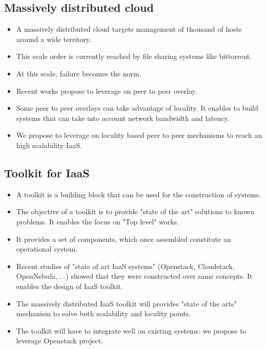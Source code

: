 \subsection{Massively distributed cloud}

\begin{itemize}

	\item A massively distributed cloud targets management of thousand of hosts around a wide territory.	
	
	\item This scale order is currently reached by file sharing systems like bittorrent.

	\item At this scale, failure becomes the norm.

	\item Recent works propose to leverage on peer to peer overlay.

	\item Some peer to peer overlays can take advantage of locality. It enables to build systems that can take
		  into account network bandwidth and latency.

	\item We propose to leverage on locality based peer to peer mechanisms to reach an high scalability IaaS.

\end{itemize}

\subsection{Toolkit for IaaS}

\begin{itemize}

	\item A toolkit is a building block that can be used for the construction of systems.

	\item The objective of a toolkit is to provide "state of the art" solutions to known problems. It enables the
		  focus on "Top level" works.

	\item It provides a set of components, which once assembled constitute an operational system.

	\item Recent studies of "state of art IaaS systems" (Openstack, Cloudstack, OpenNebula, ...) showed that they
		  were constructed over same concepts. It enables the design of IaaS toolkit.

	\item The massively distributed IaaS toolkit will provides "state of the arts" mechanism to solve both scalability and locality points.

	\item The toolkit will have to integrate well on existing systems: we propose to leverage Openstack project.

\end{itemize}
